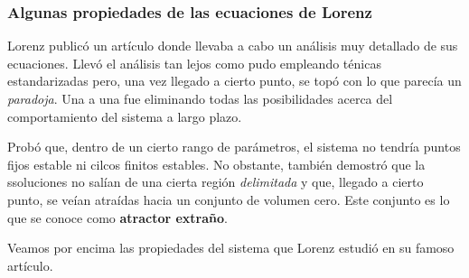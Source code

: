 \subsubsection{Algunas propiedades de las ecuaciones de Lorenz}
Lorenz publicó un artículo donde llevaba a cabo un análisis muy detallado de sus ecuaciones. Llevó el análisis tan lejos como pudo empleando ténicas estandarizadas pero, una vez llegado a cierto punto, se topó con lo que parecía un \emph{paradoja}. Una a una fue eliminando todas las posibilidades acerca del comportamiento del sistema a largo plazo.

Probó que, dentro de un cierto rango de parámetros, el sistema no tendría puntos fijos estable ni cilcos finitos estables. No obstante, también demostró que la ssoluciones no salían de una cierta región \emph{delimitada} y que, llegado a cierto punto, se veían atraídas hacia un conjunto de volumen cero. Este conjunto es lo que se conoce como \textbf{atractor extraño}.

Veamos por encima las propiedades del sistema que Lorenz estudió en su famoso artículo.

